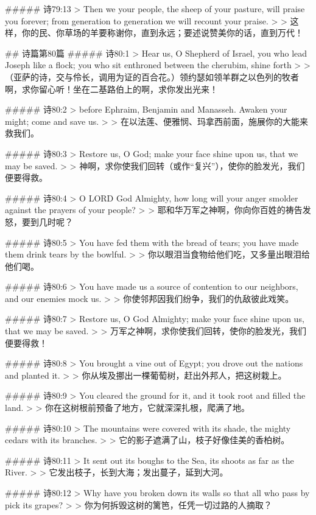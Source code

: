 ##### 诗79:13
> Then we your people, the sheep of your pasture, will praise you forever; from generation to generation we will recount your praise.
>
> 这样，你的民、你草场的羊要称谢你，直到永远；要述说赞美你的话，直到万代！


## 诗篇第80篇
##### 诗80:1
> Hear us, O Shepherd of Israel, you who lead Joseph like a flock; you who sit enthroned between the cherubim, shine forth
>
> （亚萨的诗，交与伶长，调用为证的百合花。）领约瑟如领羊群之以色列的牧者啊，求你留心听！坐在二基路伯上的啊，求你发出光来！


##### 诗80:2
> before Ephraim, Benjamin and Manasseh. Awaken your might; come and save us.
>
> 在以法莲、便雅悯、玛拿西前面，施展你的大能来救我们。


##### 诗80:3
> Restore us, O God; make your face shine upon us, that we may be saved.
>
> 神啊，求你使我们回转（或作“复兴”），使你的脸发光，我们便要得救。


##### 诗80:4
> O LORD God Almighty, how long will your anger smolder against the prayers of your people?
>
> 耶和华万军之神啊，你向你百姓的祷告发怒，要到几时呢？


##### 诗80:5
> You have fed them with the bread of tears; you have made them drink tears by the bowlful.
>
> 你以眼泪当食物给他们吃，又多量出眼泪给他们喝。


##### 诗80:6
> You have made us a source of contention to our neighbors, and our enemies mock us.
>
> 你使邻邦因我们纷争，我们的仇敌彼此戏笑。


##### 诗80:7
> Restore us, O God Almighty; make your face shine upon us, that we may be saved.
>
> 万军之神啊，求你使我们回转，使你的脸发光，我们便要得救！


##### 诗80:8
> You brought a vine out of Egypt; you drove out the nations and planted it.
>
> 你从埃及挪出一棵葡萄树，赶出外邦人，把这树栽上。


##### 诗80:9
> You cleared the ground for it, and it took root and filled the land.
>
> 你在这树根前预备了地方，它就深深扎根，爬满了地。


##### 诗80:10
> The mountains were covered with its shade, the mighty cedars with its branches.
>
> 它的影子遮满了山，枝子好像佳美的香柏树。


##### 诗80:11
> It sent out its boughs to the Sea, its shoots as far as the River.
>
> 它发出枝子，长到大海；发出蔓子，延到大河。


##### 诗80:12
> Why have you broken down its walls so that all who pass by pick its grapes?
>
> 你为何拆毁这树的篱笆，任凭一切过路的人摘取？


